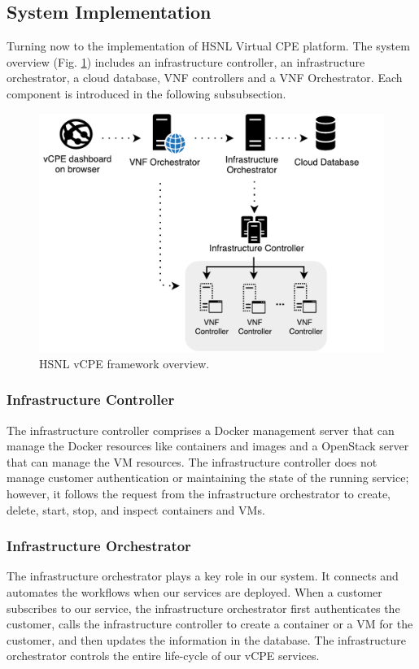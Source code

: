 \subsection{System Implementation}
Turning now to the implementation of HSNL Virtual CPE platform.  The system overview (Fig. \ref{fig:desc_vcpe_framework}) includes an infrastructure controller, an infrastructure orchestrator, a cloud database, VNF controllers and a VNF Orchestrator. Each component is introduced in the following subsubsection.

\begin{figure}[!t]
\centering
\includegraphics[width=\textwidth]{./fig/desc_vcpe_framework}
\caption{HSNL vCPE framework overview.}
\label{fig:desc_vcpe_framework}
\end{figure}

\subsubsection{Infrastructure Controller}
The infrastructure controller comprises a Docker management server that can manage the Docker resources like containers and images and a OpenStack server that can manage the VM resources. The infrastructure controller does not manage customer authentication or maintaining the state of the running service; however, it follows the request from the infrastructure orchestrator to create, delete, start, stop, and inspect containers and VMs.

\subsubsection{Infrastructure Orchestrator}
The infrastructure orchestrator plays a key role in our system. It connects and automates the workflows when our services are deployed. When a customer subscribes to our service, the infrastructure orchestrator first authenticates the customer, calls the infrastructure controller to create a container or a VM for the customer, and then updates the information in the database. The infrastructure orchestrator controls the entire life-cycle of our vCPE services.

